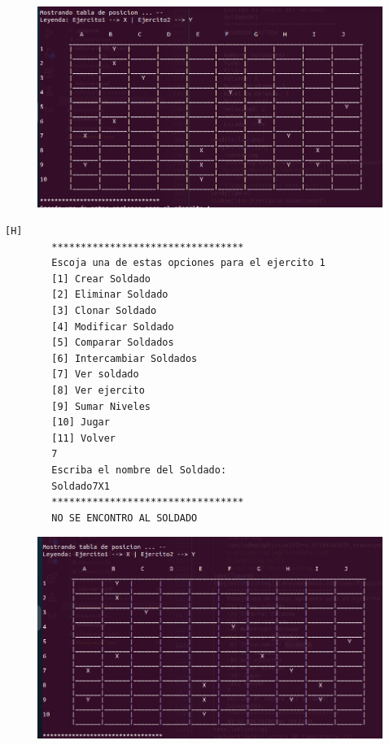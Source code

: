 \documentclass{article}
\begin{document}
	\begin{figure}[H]
		\centering
		\includegraphics[width=1.0\textwidth,keepaspectratio]{img/Commit10.png}
	\end{figure}
	\begin{lstlisting}[language=bash,caption={Ejecucion:}][H]
		*********************************
		Escoja una de estas opciones para el ejercito 1
		[1] Crear Soldado
		[2] Eliminar Soldado
		[3] Clonar Soldado
		[4] Modificar Soldado
		[5] Comparar Soldados
		[6] Intercambiar Soldados
		[7] Ver soldado
		[8] Ver ejercito
		[9] Sumar Niveles
		[10] Jugar
		[11] Volver
		7
		Escriba el nombre del Soldado:
		Soldado7X1
		*********************************
		NO SE ENCONTRO AL SOLDADO 
	\end{lstlisting}
	\begin{figure}[H]
		\centering
		\includegraphics[width=1.0\textwidth,keepaspectratio]{img/Commit10.1.png}
	\end{figure}
\end{document}
